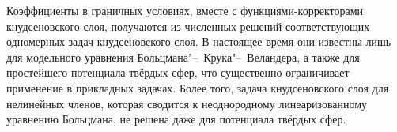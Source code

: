 \documentclass[
aps,%
12pt,%
final,%
notitlepage,%
oneside,%
onecolumn,%
nobibnotes,%
nofootinbib,%
superscriptaddress,%
noshowpacs,%
showkeys,%
floatfix,%
tightenlines,%
centertags]%
{revtex4}
\begin{document}
Коэффициенты в граничных условиях, вместе с функциями-корректорами кнудсеновского слоя,
получаются из численных решений соответствующих одномерных задач кнудсеновского слоя.
В настоящее время они известны лишь для модельного уравнения Больцмана"--~Крука"--~Веландера,
а также для простейшего потенциала твёрдых сфер, что существенно ограничивает применение
в прикладных задачах.
Более того, задача кнудсеновского слоя для нелинейных членов, которая сводится к неоднородному
линеаризованному уравнению Больцмана, не решена даже для потенциала твёрдых сфер.




\end{document}
